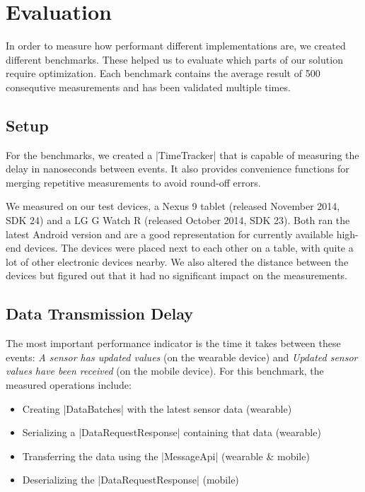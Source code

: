 \section{Evaluation}
\label{sec:evaluation}

In order to measure how performant different implementations are, we created different benchmarks.
These helped us to evaluate which parts of our solution require optimization.
Each benchmark contains the average result of 500 consequtive measurements and has been validated multiple times.

\subsection{Setup}
For the benchmarks, we created a |TimeTracker|\cite{sensordatalogger:timetracker} that is capable of measuring the delay in nanoseconds between events. It also provides convenience functions for merging repetitive measurements to avoid round-off errors.

We measured on our test devices, a Nexus 9 tablet (released November 2014, SDK 24) and a LG G Watch R (released October 2014, SDK 23). Both ran the latest Android version and are a good representation for currently available high-end devices.
The devices were placed next to each other on a table, with quite a lot of other electronic devices nearby.
We also altered the distance between the devices but figured out that it had no significant impact on the measurements.

\subsection{Data Transmission Delay}
The most important performance indicator is the time it takes between these events: \textit{A sensor has updated values} (on the wearable device) and \textit{Updated sensor values have been received} (on the mobile device). For this benchmark, the measured operations include:

\begin{itemize}[noitemsep]
    \item Creating |DataBatches|\cite{sensordatalogger:databatch} with the latest sensor data (wearable)
    \item Serializing a |DataRequestResponse|\cite{sensordatalogger:datarequestresponse} containing that data (wearable)
    \item Transferring the data using the |MessageApi|\cite{androiddocs:messageapi} (wearable \& mobile)
    \item Deserializing the |DataRequestResponse| (mobile)
\end{itemize}

